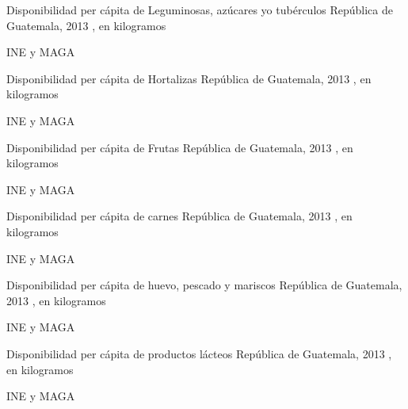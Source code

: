 %
{%
}%
{%
	Disponibilidad per cápita de Leguminosas, azúcares yo tubérculos  } %
{%
	República de Guatemala, 2013 , en kilogramos } %
{%
	\begin{tikzpicture}[x=1pt,y=1pt]    \end{tikzpicture}}%
{%
	INE y MAGA} %


%
{%
}%
{%
	Disponibilidad per cápita de Hortalizas } %
{%
	República de Guatemala, 2013 , en kilogramos } %
{%
	\begin{tikzpicture}[x=1pt,y=1pt]    \end{tikzpicture}}%
{%
	INE y MAGA} %


%
{%
}%
{%
	Disponibilidad per cápita de Frutas } %
{%
	República de Guatemala, 2013 , en kilogramos } %
{%
	\begin{tikzpicture}[x=1pt,y=1pt]    \end{tikzpicture}}%
{%
	INE y MAGA} %


%
{%
}%
{%
	Disponibilidad per cápita de carnes } %
{%
	República de Guatemala, 2013 , en kilogramos } %
{%
	\begin{tikzpicture}[x=1pt,y=1pt]    \end{tikzpicture}}%
{%
	INE y MAGA} %


%
{%
}%
{%
	Disponibilidad per cápita de huevo, pescado y mariscos } %
{%
	República de Guatemala, 2013 , en kilogramos } %
{%
	\begin{tikzpicture}[x=1pt,y=1pt]    \end{tikzpicture}}%
{%
	INE y MAGA} %


%
{%
}%
{%
	Disponibilidad per cápita de productos lácteos} %
{%
	República de Guatemala, 2013 , en kilogramos } %
{%
	\begin{tikzpicture}[x=1pt,y=1pt]    \end{tikzpicture}}%
{%
	INE y MAGA} %


